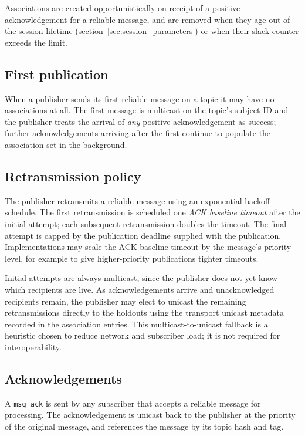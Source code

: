 Associations are created opportunistically on receipt of a positive
acknowledgement for a reliable message, and are removed when they age out of
the session lifetime (section~\ref{sec:session_parameters}) or when their
slack counter exceeds the limit.

\subsection{First publication}

When a publisher sends its first reliable message on a topic it may have no
associations at all. The first message is multicast on the topic's subject-ID
and the publisher treats the arrival of \emph{any} positive acknowledgement as
success; further acknowledgements arriving after the first continue to
populate the association set in the background.

\subsection{Retransmission policy}

The publisher retransmits a reliable message using an exponential backoff
schedule. The first retransmission is scheduled one \emph{ACK baseline
timeout} after the initial attempt; each subsequent retransmission doubles the
timeout. The final attempt is capped by the publication deadline supplied with
the publication. Implementations may scale the ACK baseline timeout by the
message's priority level, for example to give higher-priority publications
tighter timeouts.

Initial attempts are always multicast, since the publisher does not yet know
which recipients are live. As acknowledgements arrive and unacknowledged
recipients remain, the publisher may elect to unicast the remaining
retransmissions directly to the holdouts using the transport unicast metadata
recorded in the association entries. This multicast-to-unicast fallback is a
heuristic chosen to reduce network and subscriber load; it is not required for
interoperability.

\subsection{Acknowledgements}

A \texttt{msg\_ack} is sent by any subscriber that accepts a reliable message
for processing. The acknowledgement is unicast back to the publisher at the
priority of the original message, and references the message by its topic
hash and tag.

